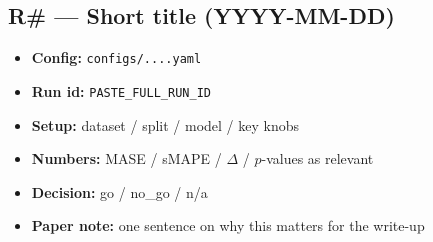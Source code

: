 
\subsection*{R\# --- Short title (YYYY-MM-DD)}
\begin{itemize}
  \item \textbf{Config:} \texttt{configs/....yaml}
  \item \textbf{Run id:} \texttt{PASTE\_FULL\_RUN\_ID}
  \item \textbf{Setup:} dataset / split / model / key knobs
  \item \textbf{Numbers:} MASE / sMAPE / $\Delta$ / $p$-values as relevant
  \item \textbf{Decision:} go / no\_go / n/a
  \item \textbf{Paper note:} one sentence on why this matters for the write-up
\end{itemize}
